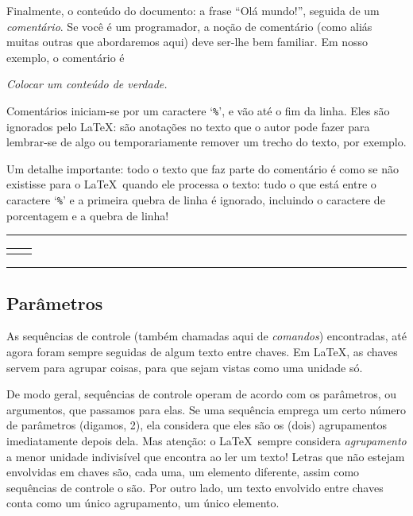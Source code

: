 Finalmente, o conteúdo do documento: a frase ``Olá mundo!'', seguida
de um \emph{comentário}. Se você é um programador, a noção de
comentário (como aliás muitas outras que abordaremos aqui)  deve
ser-lhe bem familiar. Em nosso exemplo, o comentário é 

\begin{center}
  \textit{Colocar um conteúdo de verdade.}
\end{center}

Comentários iniciam-se por um caractere `\verb.%.', e vão até o fim da
linha. Eles são ignorados pelo \LaTeX: são anotações no texto que o autor pode fazer para lembrar-se de algo ou temporariamente remover um trecho do texto, por exemplo.

Um detalhe importante: todo o texto que faz parte do comentário é como se não existisse para o \LaTeX\ quando ele processa o texto: tudo o que está entre o caractere `\verb`%`' e a primeira quebra de linha é ignorado, incluindo o caractere de porcentagem e a quebra de linha!

\medskip
\begin{center}\hrule\smallskip
\begin{tabular}{c|c}
\begin{minipage}{.405\textwidth}\footnotesize

\end{minipage} &
\begin{minipage}{.535\textwidth}

\end{minipage}
\end{tabular}
\smallskip\hrule
\end{center}
\medskip


\subsection{Parâmetros}

As sequências de controle (também chamadas aqui de
\emph{comandos}) encontradas,  até agora foram
sempre seguidas de algum texto entre chaves. Em \LaTeX, as chaves
servem para agrupar coisas, para que sejam vistas como uma unidade
só. 

De modo geral, sequências de controle operam de acordo com os
parâmetros, ou argumentos, que passamos para elas. Se uma sequência
emprega um certo número de parâmetros (digamos, 2), ela considera que
eles são os (dois) agrupamentos imediatamente depois dela. Mas
atenção: o \LaTeX\ sempre considera \emph{agrupamento} a menor unidade indivisível
que encontra ao ler um texto! Letras que não estejam  envolvidas em
chaves são, cada uma, um elemento diferente, assim como sequências de
controle o são. Por outro lado, um texto envolvido entre chaves conta
como um único agrupamento, um único elemento.

